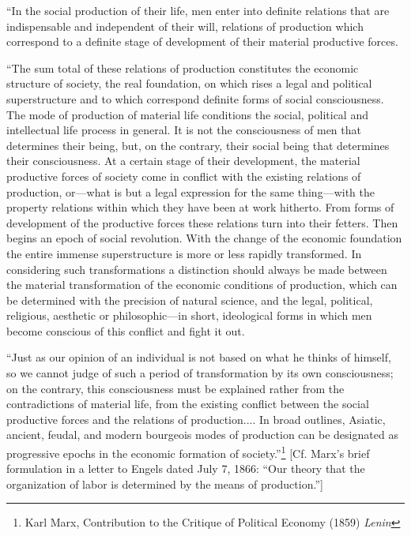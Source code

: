 \documentclass[a4paper,12pt]{book}
\begin{document}
\begin{center}
	\footnotesize{ “In the social production of their life, men enter into definite relations that are indispensable and independent of their will, relations of production which correspond to a definite stage of development of their material productive forces.

		“The sum total of these relations of production constitutes the economic structure of society, the real foundation, on which rises a legal and political superstructure and to which correspond definite forms of social consciousness. The mode of production of material life conditions the social, political and intellectual life process in general. It is not the consciousness of men that determines their being, but, on the contrary, their social being that determines their consciousness. At a certain stage of their development, the material productive forces of society come in conflict with the existing relations of production, or—what is but a legal expression for the same thing—with the property relations within which they have been at work hitherto. From forms of development of the productive forces these relations turn into their fetters. Then begins an epoch of social revolution. With the change of the economic foundation the entire immense superstructure is more or less rapidly transformed. In considering such transformations a distinction should always be made between the material transformation of the economic conditions of production, which can be determined with the precision of natural science, and the legal, political, religious, aesthetic or philosophic—in short, ideological forms in which men become conscious of this conflict and fight it out.

		“Just as our opinion of an individual is not based on what he thinks of himself, so we cannot judge of such a period of transformation by its own consciousness; on the contrary, this consciousness must be explained rather from the contradictions of material life, from the existing conflict between the social productive forces and the relations of production.... In broad outlines, Asiatic, ancient, feudal, and modern bourgeois modes of production can be designated as progressive epochs in the economic formation of society.”\footnote{Karl Marx, Contribution to the Critique of Political Economy (1859) \emph{Lenin}} [Cf. Marx’s brief formulation in a letter to Engels dated July 7, 1866: “Our theory that the organization of labor is determined by the means of production.”]}
\end{center}
\end{document}

